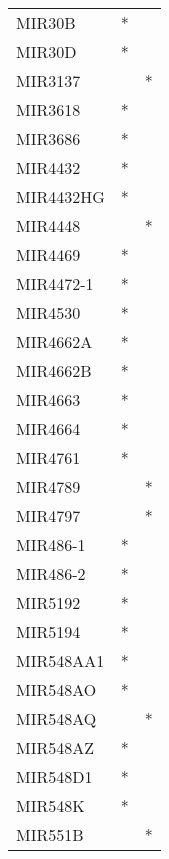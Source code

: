 \begin{longtable}{lcc}
MIR30B           &              * &            \\
MIR30D           &              * &            \\
MIR3137          &                &          * \\
MIR3618          &              * &            \\
MIR3686          &              * &            \\
MIR4432          &              * &            \\
MIR4432HG        &              * &            \\
MIR4448          &                &          * \\
MIR4469          &              * &            \\
MIR4472-1        &              * &            \\
MIR4530          &              * &            \\
MIR4662A         &              * &            \\
MIR4662B         &              * &            \\
MIR4663          &              * &            \\
MIR4664          &              * &            \\
MIR4761          &              * &            \\
MIR4789          &                &          * \\
MIR4797          &                &          * \\
MIR486-1         &              * &            \\
MIR486-2         &              * &            \\
MIR5192          &              * &            \\
MIR5194          &              * &            \\
MIR548AA1        &              * &            \\
MIR548AO         &              * &            \\
MIR548AQ         &                &          * \\
MIR548AZ         &              * &            \\
MIR548D1         &              * &            \\
MIR548K          &              * &            \\
MIR551B          &                &          * \\

\end{longtable}
